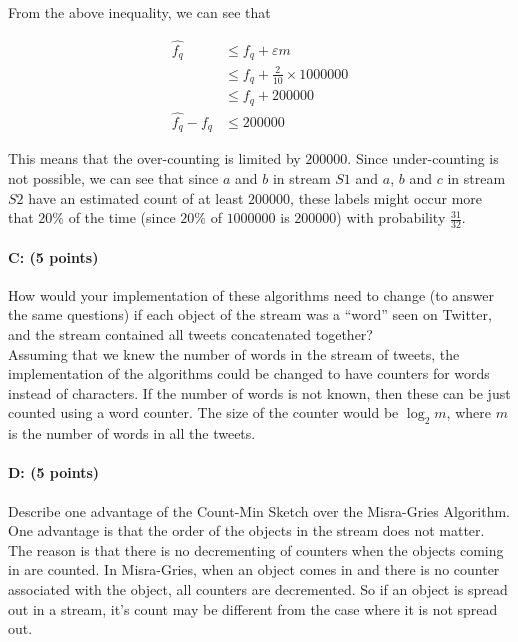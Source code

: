 \documentclass[11pt]{article}
\begin{document}
From the above inequality, we can see that 

\begin{equation*}
\begin{aligned}
\hat{f_q} &\leq f_q + \varepsilon m\\
&\leq f_q + \frac{2}{10} \times \num[group-separator={,}]{1000000}\\
&\leq f_q + \num[group-separator={,}]{200000}\\
\hat{f_q} - f_q  &\leq \num[group-separator={,}]{200000}
\end{aligned}
\end{equation*}

This means that the over-counting is limited by $\num[group-separator={,}]{200000}$. Since under-counting is not possible, we can see that since $a$ and $b$ in stream $S1$ and $a$, $b$ and $c$ in stream $S2$ have an estimated count of at least $\num[group-separator={,}]{200000}$, these labels might occur more that $20\%$ of the time (since $20\%$ of $\num[group-separator={,}]{1000000}$ is $\num[group-separator={,}]{200000}$) with probability $\frac{31}{32}$.

\paragraph{C: (5 points)} 
How would your implementation of these algorithms need to change (to answer the same questions) if each object of the stream was a \enquote{word} seen on Twitter, and the stream contained all tweets concatenated together?\\

Assuming that we knew the number of words in the stream of tweets, the implementation of the algorithms could be changed to have counters for words instead of characters. If the number of words is not known, then these can be just counted using a word counter. The size of the counter would be $\log_2 m$, where $m$ is the number of words in all the tweets.


\paragraph{D: (5 points)} 
Describe one advantage of the Count-Min Sketch over the Misra-Gries Algorithm.\\

One advantage is that the order of the objects in the stream does not matter. The reason is that there is no decrementing of counters when the objects coming in are counted. In Misra-Gries, when an object comes in and there is no counter associated with the object, all counters are decremented. So if an object is spread out in a stream, it's count may be different from the case where it is not spread out.
\end{document}

